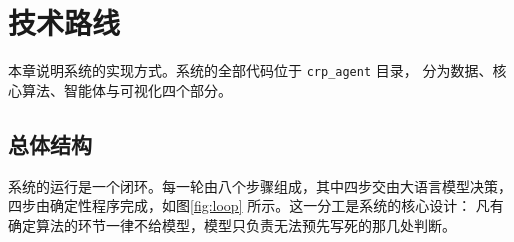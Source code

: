 
\section{技术路线}
\label{sec:method}

本章说明系统的实现方式。系统的全部代码位于 \texttt{crp\_agent} 目录，
分为数据、核心算法、智能体与可视化四个部分。

\subsection{总体结构}

系统的运行是一个闭环。每一轮由八个步骤组成，其中四步交由大语言模型决策，
四步由确定性程序完成，如图\ref{fig:loop} 所示。这一分工是系统的核心设计：
凡有确定算法的环节一律不给模型，模型只负责无法预先写死的那几处判断。

